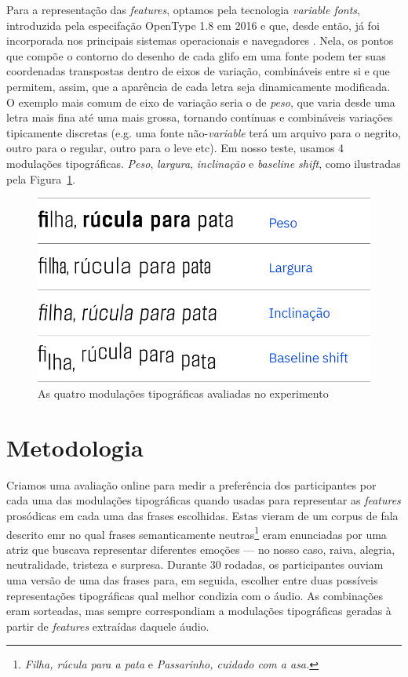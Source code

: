 \documentclass[11pt]{article}
\begin{document}
  Para a representação das {\itshape features}, optamos pela tecnologia {\itshape variable fonts}, introduzida pela especifação OpenType 1.8\cite{varfontssepcs} em 2016 e que, desde então, já foi incorporada nos principais sistemas operacionais e navegadores \cite{varfontossupport}. Nela, os pontos que compõe o contorno do desenho de cada glifo em uma fonte podem ter suas coordenadas transpostas dentro de eixos de variação, combináveis entre si e que permitem, assim, que a aparência de cada letra seja dinamicamente modificada. O exemplo mais comum de eixo de variação seria o de {\itshape peso}, que varia desde uma letra mais fina até uma mais grossa, tornando contínuas e combináveis variações tipicamente discretas (e.g. uma fonte não-{\itshape variable} terá um arquivo para o negrito, outro para o regular, outro para o leve etc). Em nosso teste, usamos 4 modulações tipográficas. {\itshape Peso}, {\itshape largura}, {\itshape inclinação} e {\itshape baseline shift}, como ilustradas pela Figura~\ref{fig:type_modulations}.
  
\begin{figure}[H]
     {\centering
    \includegraphics[width=\linewidth]{fig/modulacoes.png}
     \caption{As quatro modulações tipográficas avaliadas no experimento}
     \label{fig:type_modulations}\par}
\end{figure}
  
  \section{Metodologia}
  \label{sec:metodologia}
 
 Criamos uma avaliação online para medir a preferência dos participantes por cada uma das modulações tipográficas quando usadas para representar as {\itshape features} prosódicas em cada uma das frases escolhidas. Estas vieram de um corpus de fala descrito emr \cite{pdpcosta2015} no qual frases semanticamente neutras\footnote{{\itshape Filha, rúcula para a pata} e {\itshape Passarinho, cuidado com a asa.}} eram enunciadas por uma atriz que buscava representar diferentes emoções --- no nosso caso, raiva, alegria, neutralidade, tristeza e surpresa. Durante 30 rodadas, os participantes ouviam uma versão de uma das frases para, em seguida, escolher entre duas possíveis representações tipográficas qual melhor condizia com o áudio. As combinações eram sorteadas, mas sempre correspondiam a modulações tipográficas geradas à partir de {\itshape features} extraídas daquele áudio.
  
\end{document}
